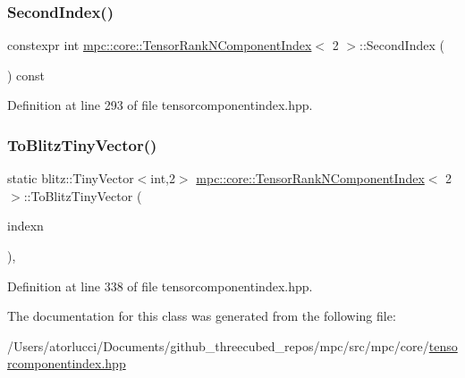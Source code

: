 \subsubsection{\texorpdfstring{Second\+Index()}{SecondIndex()}}
{\footnotesize\ttfamily constexpr int \mbox{\hyperlink{classmpc_1_1core_1_1_tensor_rank_n_component_index}{mpc\+::core\+::\+Tensor\+Rank\+N\+Component\+Index}}$<$ 2 $>$\+::Second\+Index (\begin{DoxyParamCaption}{ }\end{DoxyParamCaption}) const\hspace{0.3cm}{\ttfamily [inline]}}



Definition at line 293 of file tensorcomponentindex.\+hpp.

\mbox{\label{classmpc_1_1core_1_1_tensor_rank_n_component_index_3_012_01_4_a4de4ca14032dfc36db2289015bdf87d6}} 
\subsubsection{\texorpdfstring{To\+Blitz\+Tiny\+Vector()}{ToBlitzTinyVector()}}
{\footnotesize\ttfamily static blitz\+::\+Tiny\+Vector$<$int,2$>$ \mbox{\hyperlink{classmpc_1_1core_1_1_tensor_rank_n_component_index}{mpc\+::core\+::\+Tensor\+Rank\+N\+Component\+Index}}$<$ 2 $>$\+::To\+Blitz\+Tiny\+Vector (\begin{DoxyParamCaption}\item[{const \mbox{\hyperlink{classmpc_1_1core_1_1_tensor_rank_n_component_index}{mpc\+::core\+::\+Tensor\+Rank\+N\+Component\+Index}}$<$ 2 $>$ \&}]{indexn }\end{DoxyParamCaption})\hspace{0.3cm}{\ttfamily [inline]}, {\ttfamily [static]}}



Definition at line 338 of file tensorcomponentindex.\+hpp.



The documentation for this class was generated from the following file\+:\begin{DoxyCompactItemize}
\item 
/\+Users/atorlucci/\+Documents/github\+\_\+threecubed\+\_\+repos/mpc/src/mpc/core/\mbox{\hyperlink{tensorcomponentindex_8hpp}{tensorcomponentindex.\+hpp}}\end{DoxyCompactItemize}
